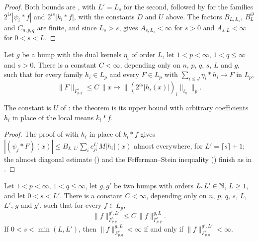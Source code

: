 \begin{proof}
\leanok
Both bounds are , with $L' = L_s$ for the second, followed by
 for the families $2^{is} |\psi_i * f|$ and
$2^{is} |k_i * f|$, with the constants $D$ and $U$ above. The factors $B_{L,L_s}$, $B^\Theta_L$
and $C_{n,p,q}$ are finite, and since $L_s > s$,  gives
$A_{s,L_s} < \infty$ for $s > 0$ and $A_{s,L} < \infty$ for $0 < s < L$.
\end{proof}

\begin{theorem}
\label{thm:tl-synthesis-dual}
\leanok
{}
Let $g$ be a bump with the dual kernels $\eta_i$ of order $L$, let $1 < p < \infty$,
$1 < q \leq \infty$ and $s > 0$. There is a constant $C < \infty$, depending only on $n$, $p$, $q$,
$s$, $L$ and $g$, such that for every family $h_i \in L_p$ and every $F \in L_p$ with
$\sum_{i \leq J} \eta_i * h_i \to F$ in $L_p$,
\[
  \|F\|_{F^s_{p,q}} \leq C \, \bigl\| x \mapsto \|(2^{is} |h_i(x)|)_i\|_{\ell_q} \bigr\|_p .
\]
\end{theorem}

The constant is $U$ of : the theorem is its upper bound with arbitrary
coefficients $h_i$ in place of the local means $k_i * f$.

\begin{proof}
\leanok
The proof of  with $h_i$ in place of $k_i * f$ gives
$|(\psi_j * F)(x)| \leq B_{L,L'} \sum_i c^{L'}_{ji} M|h_i|(x)$ almost everywhere, for
$L' = \lceil s \rceil + 1$; the almost diagonal estimate ()
and the Fefferman--Stein inequality () finish as in
.
\end{proof}

\begin{corollary}
\label{cor:tl-local-means-independence}
\leanok
{}
Let $1 < p < \infty$, $1 < q \leq \infty$, let $g, g'$ be two bumps with orders
$L, L' \in \mathbb{N}$, $L \geq 1$, and let $0 < s < L'$. There is a constant $C < \infty$, depending only
on $n$, $p$, $q$, $s$, $L$, $L'$, $g$ and $g'$, such that for every $f \in L_p$,
\[
  \|f\|^{g',L'}_{F^s_{p,q}} \leq C \, \|f\|^{g,L}_{F^s_{p,q}} .
\]
If $0 < s < \min(L, L')$, then $\|f\|^{g,L}_{F^s_{p,q}} < \infty$ if and only if
$\|f\|^{g',L'}_{F^s_{p,q}} < \infty$.
\end{corollary}


